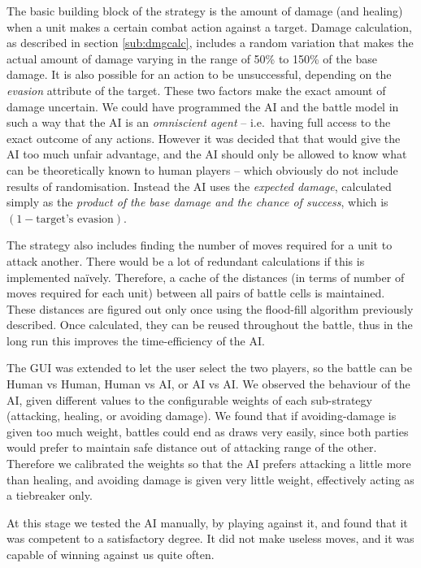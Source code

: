 The basic building block of the strategy is the amount of damage (and healing) when a unit makes a certain combat action against a target. Damage calculation, as described in section \ref{sub:dmgcalc}, includes a random variation that makes the actual amount of damage varying in the range of 50\% to 150\% of the base damage. It is also possible for an action to be unsuccessful, depending on the \textit{evasion} attribute of the target. These two factors make the exact amount of damage uncertain. We could have programmed the AI and the battle model in such a way that the AI is an \textit{omniscient agent} -- i.e.\ having full access to the exact outcome of any actions.\cite{russell2010artificial} However it was decided that that would give the AI too much unfair advantage, and the AI should only be allowed to know what can be theoretically known to human players -- which obviously do not include results of randomisation. Instead the AI uses the \textit{expected damage}, calculated simply as the \textit{product of the base damage and the chance of success}, which is $(1 - \text{target's evasion})$. 

The strategy also includes finding the number of moves required for a unit to attack another. There would be a lot of redundant calculations if this is implemented naïvely. Therefore, a cache of the distances (in terms of number of moves required for each unit) between all pairs of battle cells is maintained. These distances are figured out only once using the flood-fill algorithm previously described. Once calculated, they can be reused throughout the battle, thus in the long run this improves the time-efficiency of the AI.

The GUI was extended to let the user select the two players, so the battle can be Human vs Human, Human vs AI, or AI vs AI. We observed the behaviour of the AI, given different values to the configurable weights of each sub-strategy (attacking, healing, or avoiding damage). We found that if avoiding-damage is given too much weight, battles could end as draws very easily, since both parties would prefer to maintain safe distance out of attacking range of the other. Therefore we calibrated the weights so that the AI prefers attacking a little more than healing, and avoiding damage is given very little weight, effectively acting as a tiebreaker only.

At this stage we tested the AI manually, by playing against it, and found that it was competent to a satisfactory degree. It did not make useless moves, and it was capable of winning against us quite often.

